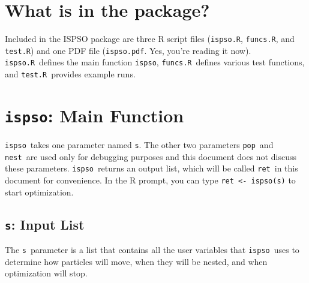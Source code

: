 \documentclass{article}
\def\ispsoR{\texttt{ispso.R}}
\def\funcsR{\texttt{funcs.R}}
\def\testR{\texttt{test.R}}
\def\ispsopdf{\texttt{ispso.pdf}}
\def\ispso{\texttt{ispso}}
\def\s{\texttt{s}}
\def\pop{\texttt{pop}}
\def\nest{\texttt{nest}}
\def\ret{\texttt{ret}}
\begin{document}
\section{What is in the package?}

Included in the ISPSO package are three R script files (\ispsoR, \funcsR, and \testR) and one PDF file (\ispsopdf. Yes, you're reading it now).
\ispsoR\ defines the main function \ispso, \funcsR\ defines various test functions, and \testR\ provides example runs.

\section{\ispso: Main Function}

\ispso\ takes one parameter named \s.
The other two parameters \pop\ and \nest\ are used only for debugging purposes and this document does not discuss these parameters.
\ispso\ returns an output list, which will be called \ret\ in this document for convenience.
In the R prompt, you can type \texttt{ret <- ispso(s)} to start optimization.

\subsection{\s: Input List}

The \s\ parameter is a list that contains all the user variables that \ispso\ uses to determine how particles will move, when they will be nested, and when optimization will stop.
\end{document}
